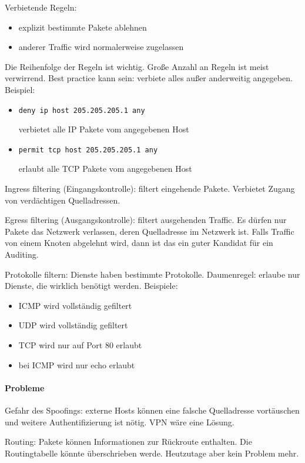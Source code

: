 Verbietende Regeln:
\begin{itemize}
  \item explizit bestimmte Pakete ablehnen
  \item anderer Traffic wird normalerweise zugelassen
\end{itemize}

Die Reihenfolge der Regeln ist wichtig.
Große Anzahl an Regeln ist meist verwirrend.
Best practice kann sein: verbiete alles außer anderweitig angegeben.
Beispiel:
\begin{itemize}
  \item \texttt{deny ip host 205.205.205.1 any}

    verbietet alle IP Pakete vom angegebenen Host

  \item \texttt{permit tcp host 205.205.205.1 any}

    erlaubt alle TCP Pakete vom angegebenen Host
\end{itemize}

Ingress filtering (Eingangskontrolle): filtert eingehende Pakete.
Verbietet Zugang von verdächtigen Quelladressen.

Egress filtering (Ausgangskontrolle): filtert ausgehenden Traffic.
Es dürfen nur Pakete das Netzwerk verlassen, deren Quelladresse im Netzwerk ist.
Falls Traffic von einem Knoten abgelehnt wird, dann ist das ein guter Kandidat für ein
Auditing.

Protokolle filtern: Dienste haben bestimmte Protokolle.
Daumenregel: erlaube nur Dienste, die wirklich benötigt werden.
Beispiele:
\begin{itemize}
  \item ICMP wird vollständig gefiltert
  \item UDP wird vollständig gefiltert
  \item TCP wird nur auf Port 80 erlaubt
  \item bei ICMP wird nur echo erlaubt
\end{itemize}

\paragraph{Probleme}%

Gefahr des Spoofings: externe Hosts können eine falsche Quelladresse vortäuschen und
weitere Authentifizierung ist nötig.
VPN wäre eine Lösung.

Routing: Pakete können Informationen zur Rückroute enthalten.
Die Routingtabelle könnte überschrieben werde.
Heutzutage aber kein Problem mehr.

